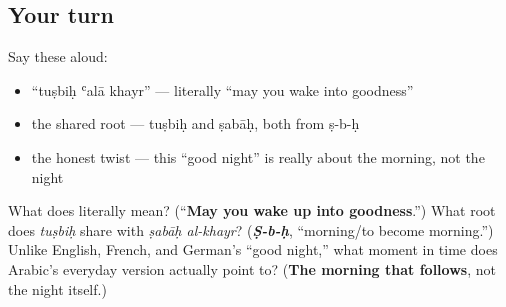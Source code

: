 \subsection*{Your turn}
Say these aloud:

\begin{itemize}
\raggedright
  \item \textquotedblleft{}tuṣbiḥ ʿalā khayr\textquotedblright{} — literally \textquotedblleft{}may you wake into goodness\textquotedblright{}
  \item the shared root — tuṣbiḥ and ṣabāḥ, both from ṣ-b-ḥ
  \item the honest twist — this \textquotedblleft{}good night\textquotedblright{} is really about the morning, not the night
\end{itemize}

\begin{tcolorbox}[breakable,colback=teal!4,colframe=teal!35!black,title={Before you move on}]
What does \textbf{  } literally mean? (\textquotedblleft{}\textbf{May you wake up into goodness}.\textquotedblright{}) What root does \emph{tuṣbiḥ} share with \emph{ṣabāḥ al-khayr}? (\emph{\textbf{Ṣ-b-ḥ}}, \textquotedblleft{}morning/to become morning.\textquotedblright{}) Unlike English, French, and German's \textquotedblleft{}good night,\textquotedblright{} what moment in time does Arabic's everyday version actually point to? (\textbf{The morning that follows}, not the night itself.)
\end{tcolorbox}
